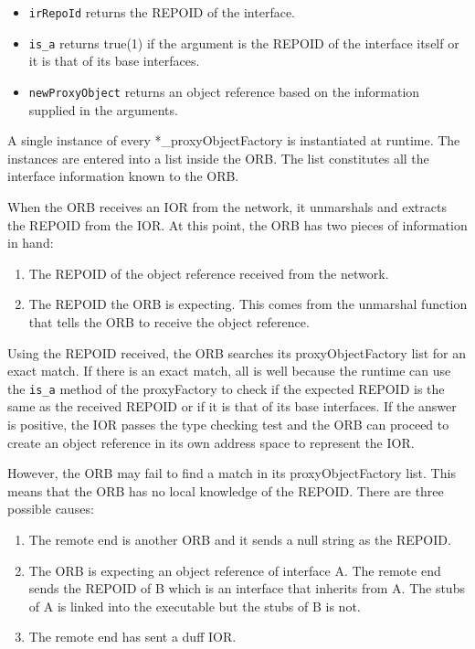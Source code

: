 \documentclass[11pt,twoside,onecolumn]{book}
\begin{document}
\begin{itemize}
\item {\tt irRepoId} returns the REPOID of the interface.
\item {\tt is\_a} returns true(1) if the argument is the REPOID of the
interface itself or it is that of its base interfaces.
\item {\tt newProxyObject} returns an object reference based on the
information supplied in the arguments.
\end{itemize}

A single instance of every *\_proxyObjectFactory is instantiated at runtime.
The instances are entered into a list inside the ORB. The list constitutes
all the interface information known to the ORB.

When the ORB receives an IOR from the network, it unmarshals and
extracts the REPOID from the IOR. At this point, the ORB has two pieces of
information in hand:

\begin{enumerate}
\item The REPOID of the object reference received from the network.
\item The REPOID the ORB is expecting. This comes from the unmarshal
      function that tells the ORB to receive the object reference.
\end{enumerate}

Using the REPOID received, the ORB searches its proxyObjectFactory list for
an exact match. If there is an exact match, all is well because the runtime
can use the {\tt is\_a} method of the proxyFactory to check if the expected
REPOID is the same as the received REPOID or if it is that of its base
interfaces. If the answer is positive, the IOR passes the type checking
test and the ORB can proceed to create an object reference in its own
address space to represent the IOR.

However, the ORB may fail to find a match in its proxyObjectFactory
list. This means that the ORB has no local knowledge of the REPOID.
There are three possible causes:

\begin{enumerate}
\item The remote end is another ORB and it sends a null string as the REPOID.
\item The ORB is expecting an object reference of interface A. The remote
      end sends the REPOID of B which is an interface that inherits from A.
      The stubs of A is linked into the executable but the stubs of B is
      not.
\item The remote end has sent a duff IOR.
\end{enumerate}
\end{document}
